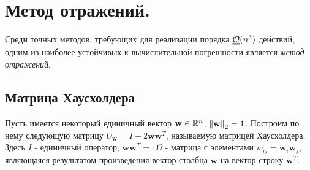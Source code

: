 \section{Метод отражений.}

Среди точных методов, требующих для реализации порядка $\underline{\underline{\mathcal{O}}}(n^3)$ действий,
одним из наиболее устойчивых к вычислительной погрешности является \textit{метод отражений}.

\subsection*{Матрица Хаусхолдера}

Пусть имеется некоторый единичный вектор $\mathbf{w}\in\mathbb{R}^n$, $\left\lVert\mathbf{w}\right\rVert_{2}=1$.
Построим по нему следующую матрицу $U_\mathbf{w} = I-2\mathbf{w}\mathbf{w}^T$, называемую матрицей
Хаусхолдера. Здесь $I$ - единичный оператор, $\mathbf{w}\mathbf{w}^T=:\Omega$ - матрица
с элементами $w_{ij}=\mathbf{w}_i\mathbf{w}_j$, являющаяся результатом произведения вектор-столбца
$\mathbf{w}$ на вектор-строку $\mathbf{w}^T$.

